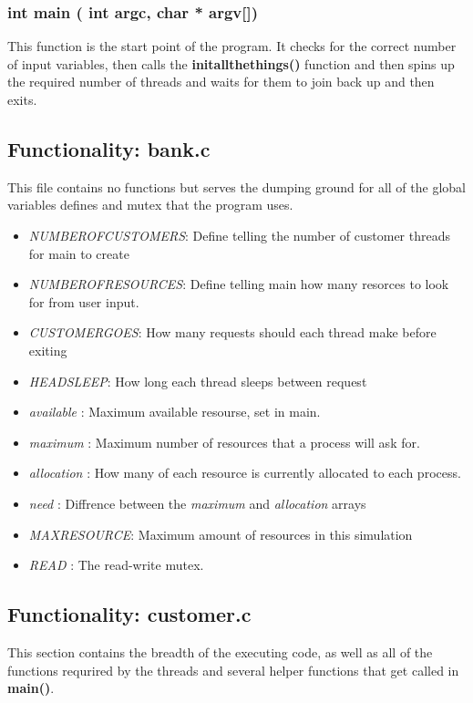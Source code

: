 \documentclass[11pt]{article}
\begin{document}
\subsubsection{ int main ( int argc, char * argv[])}
This function is the start point of the program. It checks for the correct number of input variables, then calls the \textbf{ init\textunderscore all\textunderscore the\textunderscore things()} function and then spins up the required number of threads and waits for them to join back up and then exits.

\subsection{Functionality: bank.c}
This file contains no functions but serves the dumping ground for all of the global variables defines and mutex that the program uses.
\begin{itemize}
\item \textit{ NUMBER\textunderscore OF\textunderscore CUSTOMERS}: Define telling the number of customer threads for main to create
\item \textit{NUMBER\textunderscore OF\textunderscore RESOURCES}: Define telling main how many resorces to look for from user input.
\item \textit{ CUSTOMER\textunderscore GOES}: How many requests should each thread make before exiting
\item \textit{ HEAD\textunderscore SLEEP}: How long each thread sleeps between request
\item \textit{ available }: Maximum available resourse, set in main.
\item \textit{ maximum }: Maximum number of resources that a process will ask for.
\item \textit{ allocation }: How many of each resource is currently allocated to each process.
\item \textit{ need }: Diffrence between the \textit{maximum} and \textit{allocation} arrays
\item \textit{ MAX\textunderscore RESOURCE}: Maximum amount of resources in this simulation
\item \textit{ READ }: The read-write mutex.
\end{itemize}

\subsection{Functionality: customer.c}
This section contains the breadth of the executing code, as well as all of the functions requrired by the threads and several helper functions that get called in \textbf{main()}.
\end{document}
